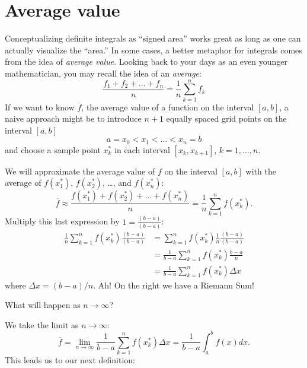 \documentclass{ximera}
\begin{document}
\section{Average value}

Conceptualizing definite integrals as ``signed area'' works great as
long as one can actually visualize the ``area.'' In some cases, a
better metaphor for integrals comes from the idea of \textit{average
  value}.  Looking back to your days as an even younger mathematician,
you may recall the idea of an \textit{average}:
\[
\frac{f_1+f_2+\dots+f_n}{n} = \frac{1}{n}\sum_{k=1}^n f_k
\]
If we want to know $\overline{f}$, the average value of a function on the interval $[a,b]$, a naive approach
might be to introduce $n+1$ equally spaced
grid points on the interval $[a,b]$
\[
a=x_0 < x_1 < \dots < x_{n}=b
\]
and choose a sample point $x_k^*$ in  each interval $[x_k,x_{k+1}]$, $k=1,\dots,n$. 

We will approximate the average value of $f$ on the interval $[a,b]$ with the average of $f(x_1^*)$,
$f(x_2^*)$, \dots, and  $f(x_n^*)$:
\[
\overline{f}\approx\frac{f(x_1^*) + f(x_2^*) + \dots + f(x_n^*)}{n} = \frac1n\sum_{k=1}^n f(x_k^*).
\]
Multiply this last expression by $1 = \frac{(b-a)}{(b-a)}$:
\begin{align*}
  \frac1n \sum_{k=1}^n f(x_k^*)\frac{(b-a)}{(b-a)} &= \sum_{k=1}^n f(x_k^*)\frac1n \frac{(b-a)}{(b-a)} \\
  &= \frac{1}{b-a} \sum_{k=1}^n f(x_k^*)\frac{b-a}n  \\
  &=\frac{1}{b-a} \sum_{k=1}^n f(x_k^*)\Delta x
\end{align*}
where $\Delta x = (b-a)/n$.  Ah! On the right we have a Riemann Sum!

What will happen  as $n\to\infty$?

We take the limit as $n\to\infty$:
\[
\overline{f}=\lim_{n\to\infty} \frac{1}{b-a} \sum_{k=1}^n f(x_k^*)\Delta x = \frac{1}{b-a} \int_a^b f(x) dx.
\]
This leads us to our next definition:
\end{document}

